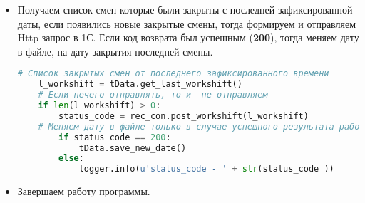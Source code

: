 \begin{itemize}
\item Получаем список смен которые были закрыты с последней зафиксированной даты, если появились новые закрытые смены, тогда формируем и отправляем Http запрос в 1С. 
Если код возврата был успешным (\textbf{200}), тогда меняем дату в файле, на дату закрытия последней смены.

\begin{tcolorbox}
	\begin{lstlisting}[language=Python,ndkeywordstyle=\color{darkgray}\bfseries,identifierstyle=\color{black},stringstyle=\color{red}\ttfamily,showstringspaces=false,keepspaces=true,extendedchars=\true]
	# Список закрытых смен от последнего зафиксированного времени
	l_workshift = tData.get_last_workshift()
	# Если нечего отправлять, то и  не отправляем
	if len(l_workshift) > 0:
		status_code = rec_con.post_workshift(l_workshift)
	# Меняем дату в файле только в случае успешного результата работы 1С
		if status_code == 200:
			tData.save_new_date()
		else:
			logger.info(u'status_code - ' + str(status_code ))
	\end{lstlisting}
\end{tcolorbox}

\item Завершаем работу программы.

\end{itemize}